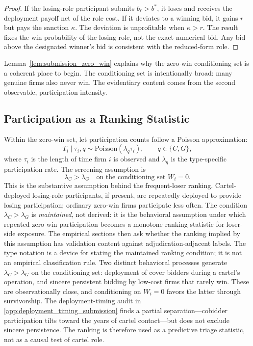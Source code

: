 \begin{proof}
If the losing-role participant submits $b_\ell>b^*$, it loses
and receives the deployment payoff net of the role cost. If it
deviates to a winning bid, it gains $r$ but pays the sanction
$\kappa$. The deviation is unprofitable when $\kappa>r$. The
result fixes the win probability of the losing role, not the
exact numerical bid. Any bid above the designated winner's bid is
consistent with the reduced-form role. 
\end{proof}

Lemma~\ref{lem:submission_zero_win} explains why the zero-win
conditioning set is a coherent place to begin. The conditioning
set is intentionally broad: many genuine firms also never win.
The evidentiary content comes from the second observable,
participation intensity.

\subsection{Participation as a Ranking Statistic}
\label{app:framework_participation}

Within the zero-win set, let participation counts follow a
Poisson approximation:
\[
  T_i \mid \tau_i, q \sim \text{Poisson}(\lambda_q \tau_i),
  \qquad q\in\{C,G\},
\]
where $\tau_i$ is the length of time firm $i$ is observed and
$\lambda_q$ is the type-specific participation rate. The
screening assumption is
\[
  \lambda_C>\lambda_G
  \quad\text{on the conditioning set } W_i=0.
\]
This is the substantive assumption behind the frequent-loser
ranking. Cartel-deployed losing-role participants, if present,
are repeatedly deployed to provide losing participation; ordinary
zero-win firms participate less often.
The condition $\lambda_C>\lambda_G$ is \emph{maintained}, not
derived: it is the behavioral assumption under which repeated
zero-win participation becomes a monotone ranking statistic for
loser-side exposure. The empirical sections then ask whether
the ranking implied by this assumption has validation content
against adjudication-adjacent labels.
The type notation is a device for stating the maintained ranking
condition; it is not an empirical classification rule.
Two distinct behavioral processes generate $\lambda_C>\lambda_G$
on the conditioning set: deployment of cover bidders during a
cartel's operation, and sincere persistent bidding by low-cost
firms that rarely win. These are observationally close, and
conditioning on $W_i=0$ favors the latter through survivorship.
The deployment-timing audit in
\ref{app:deployment_timing_submission} finds a partial
separation---cobidder participation tilts toward the years of
cartel contact---but does not exclude sincere persistence. The
ranking is therefore used as a predictive triage statistic, not
as a causal test of cartel role.

